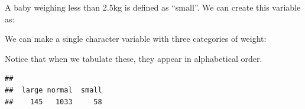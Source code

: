 \documentclass[
]{book}
\newenvironment{Shaded}{\begin{snugshade}}{\end{snugshade}}
\newcommand{\DecValTok}[1]{\textcolor[rgb]{0.00,0.00,0.81}{#1}}
\newcommand{\FloatTok}[1]{\textcolor[rgb]{0.00,0.00,0.81}{#1}}
\newcommand{\FunctionTok}[1]{\textcolor[rgb]{0.00,0.00,0.00}{#1}}
\newcommand{\NormalTok}[1]{#1}
\newcommand{\OtherTok}[1]{\textcolor[rgb]{0.56,0.35,0.01}{#1}}
\newcommand{\SpecialCharTok}[1]{\textcolor[rgb]{0.00,0.00,0.00}{#1}}
\newcommand{\StringTok}[1]{\textcolor[rgb]{0.31,0.60,0.02}{#1}}
\begin{document}
\begin{Shaded}
\end{Shaded}

A baby weighing less than 2.5kg is defined as ``small''. We can create this variable as:

\begin{Shaded}
\end{Shaded}

We can make a single character variable with three categories of weight:

\begin{Shaded}
\end{Shaded}

Notice that when we tabulate these, they appear in alphabetical order.

\begin{Shaded}
\end{Shaded}

\begin{verbatim}
## 
##  large normal  small 
##    145   1033     58
\end{verbatim}
\end{document}
